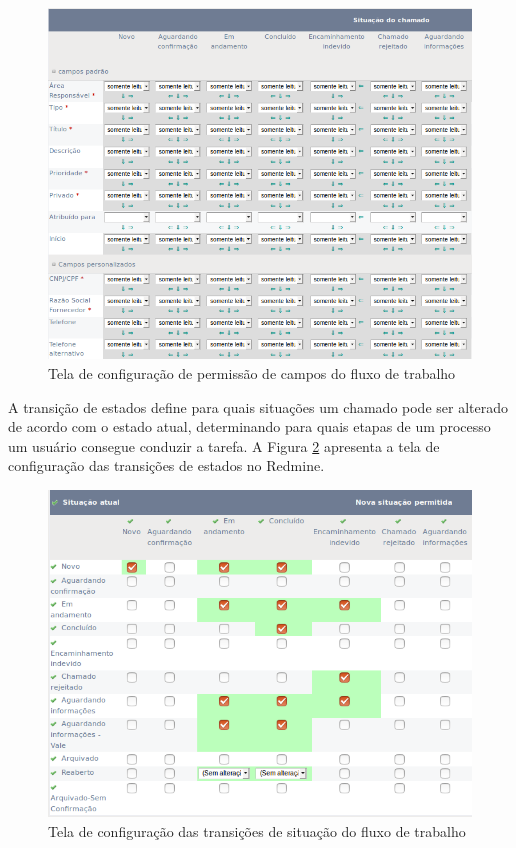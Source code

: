 \begin{figure}[H]
  \centering
  \includegraphics[width=1.0\textwidth]{imagens/workflow_fields.png}
  \caption{Tela de configuração de permissão de campos do fluxo de trabalho}
  \label{fig:redmine_campos}
\end{figure}

A transição de estados define para quais situações um chamado pode ser alterado de acordo com o estado atual, determinando para quais etapas de um processo um usuário consegue conduzir a tarefa. A Figura \ref{fig:redmine_transicoes} apresenta a tela de configuração das transições de estados no Redmine.

\begin{figure}[H]
  \centering
  \includegraphics[width=1.0\textwidth]{imagens/workflow_status.png}
  \caption{Tela de configuração das transições de situação do fluxo de trabalho}
  \label{fig:redmine_transicoes}
\end{figure}

